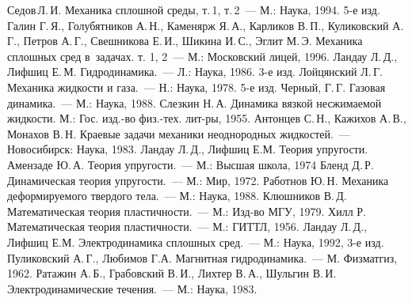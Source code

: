 \documentclass[a4paper,11pt]{article}
\begin{document}
\begin{thebibliography}{16}
\setlength\itemsep{-.5mm}
 Седов\,Л.\,И. Механика сплошной среды, т.\,1, т.\,2~--- М.: Наука, 1994. 5-е изд.
 Галин Г.\,Я., Голубятников А.\,Н., Каменярж Я.\,А., Карликов В.\,П.,
Куликовский А.\,Г., Петров А.\,Г., Свешникова Е.\,И., Шикина И.\,С., Эглит М.\,Э. Механика сплошных сред
в~задачах. т. 1, 2~--- М.: Московский лицей, 1996.
 Ландау Л.\,Д., Лифшиц Е.\,М. Гидродинамика.~--- Л.: Наука, 1986. 3-е изд.
 Лойцянский Л.\,Г. Механика жидкости и газа.~--- Н.: Наука, 1978. 5-е изд.
 Черный, Г.\,Г. Газовая динамика.~--- М.: Наука, 1988.
 Слезкин Н.\,А. Динамика вязкой несжимаемой жидкости. М.: Гос. изд.-во физ.-тех. лит-ры, 1955.
 Антонцев С.\,Н., Кажихов А.\,В., Монахов В.\,Н.
Краевые задачи механики неоднородных жидкостей.~--- Новосибирск: Наука, 1983.
 Ландау Л.\,Д., Лифшиц Е.М. Теория упругости.
 Амензаде Ю.\,А. Теория упругости.~--- М.: Высшая школа, 1974
 Бленд Д.\,Р. Динамическая теория упругости.~--- М.: Мир, 1972.
 Работнов Ю.\,Н. Механика деформируемого твердого тела.~--- М.: Наука, 1988.
 Клюшников В.\,Д. Математическая теория пластичности.~--- М.: Изд-во МГУ, 1979.
 Хилл Р. Математическая теория пластичности.~--- М.: ГИТТЛ, 1956.
 Ландау Л.\,Д., Лифшиц Е.М. Электродинамика сплошных сред.~--- М.: Наука, 1992, 3-е изд.
 Пуликовский А.\,Г., Любимов Г.А. Магнитная гидродинамика.~--- М. Физматгиз, 1962.
 Ратажин А.\,Б., Грабовский В.\,И., Лихтер В.\,А., Шульгин В.\,И.
Электродинамические течения.~--- М.: Наука, 1983.
\end{thebibliography}

\medskip\dmvntrail
\end{document}
